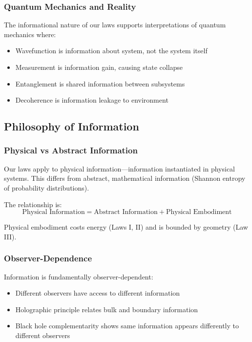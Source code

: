 \documentclass[11pt,a4paper]{article}
\theoremstyle{plain}
\theoremstyle{definition}
\theoremstyle{remark}
\begin{document}
\subsubsection{Quantum Mechanics and Reality}

The informational nature of our laws supports interpretations of quantum mechanics where:

\begin{itemize}[leftmargin=*]
\item Wavefunction is information about system, not the system itself
\item Measurement is information gain, causing state collapse
\item Entanglement is shared information between subsystems
\item Decoherence is information leakage to environment
\end{itemize}

\subsection{Philosophy of Information}

\subsubsection{Physical vs Abstract Information}

Our laws apply to physical information—information instantiated in physical systems. This differs from abstract, mathematical information (Shannon entropy of probability distributions).

The relationship is:
\begin{equation}
\text{Physical Information} = \text{Abstract Information} + \text{Physical Embodiment}
\end{equation}

Physical embodiment costs energy (Laws I, II) and is bounded by geometry (Law III).

\subsubsection{Observer-Dependence}

Information is fundamentally observer-dependent:
\begin{itemize}[leftmargin=*]
\item Different observers have access to different information
\item Holographic principle relates bulk and boundary information
\item Black hole complementarity shows same information appears differently to different observers
\end{itemize}
\end{document}
